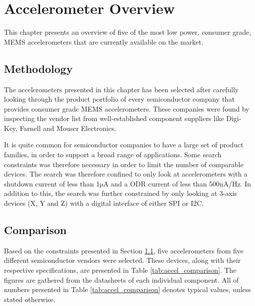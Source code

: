\chapter{Accelerometer Overview}
\label{chap:overview}

This chapter presents an overview of five of the most low power, consumer grade, MEMS accelerometers that are currently available on the market.

\section{Methodology}
\label{sec:methodology}

The accelerometers presented in this chapter has been selected after carefully looking through the product portfolio of every semiconductor company that provides consumer grade MEMS accelerometers. These companies were found by inspecting the vendor list from well-established component suppliers like Digi-Key, Farnell and Mouser Electronics. 

It is quite common for semiconductor companies to have a large set of product families, in order to support a broad range of applications. Some search constraints was therefore necessary in order to limit the number of comparable devices. The search was therefore confined to only look at accelerometers with a shutdown current of less than 1$\si{\micro\ampere}$ and a ODR current of less than 500$\si{\nano\ampere}$/Hz. In addition to this, the search was further constrained by only looking at 3-axis devices (X, Y and Z) with a digital interface of either SPI or I2C.

\newpage

\section{Comparison}

Based on the constraints presented in Section \ref{sec:methodology}, five accelerometers from five different semiconductor vendors were selected. These devices, along with their respective specifications, are presented in Table \ref{tab:accel_comparison}. The figures are gathered from the datasheets of each individual component. All of numbers presented in Table \ref{tab:accel_comparison} denotes typical values, unless stated otherwise. 


